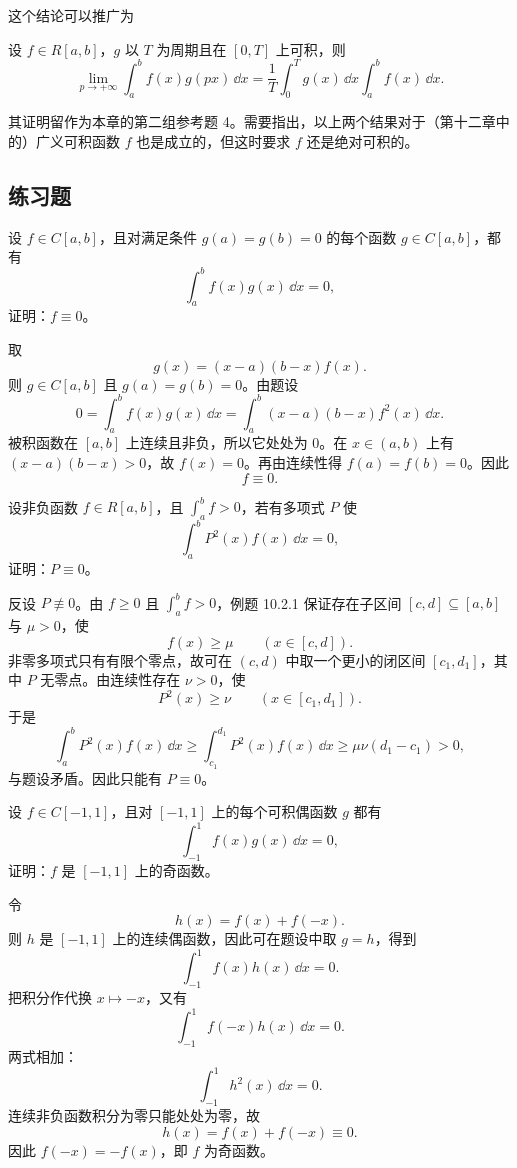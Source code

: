 这个结论可以推广为

\begin{xexample}[10.2.7（Riemann 定理）]
设 $f\in R[a,b]$，$g$ 以 $T$ 为周期且在 $[0,T]$ 上可积，则
\[
  \lim_{p\to+\infty}\int_a^b f(x)g(px)\,\dd x
  =\frac1T\int_0^T g(x)\,\dd x\int_a^b f(x)\,\dd x.
\]
\end{xexample}

其证明留作为本章的第二组参考题 4。需要指出，以上两个结果对于（第十二章中的）广义可积函数 $f$ 也是成立的，但这时要求 $f$ 还是绝对可积的。

\subsection{练习题}

\begin{xexercise}[1]
设 $f\in C[a,b]$，且对满足条件 $g(a)=g(b)=0$ 的每个函数 $g\in C[a,b]$，都有
\[
  \int_a^b f(x)g(x)\,\dd x=0,
\]
证明：$f\equiv0$。
\end{xexercise}
\begin{xsolution}
取
\[
  g(x)=(x-a)(b-x)f(x).
\]
则 $g\in C[a,b]$ 且 $g(a)=g(b)=0$。由题设
\[
  0=\int_a^b f(x)g(x)\,\dd x
  =\int_a^b(x-a)(b-x)f^2(x)\,\dd x.
\]
被积函数在 $[a,b]$ 上连续且非负，所以它处处为 $0$。在 $x\in(a,b)$ 上有 $(x-a)(b-x)>0$，故 $f(x)=0$。再由连续性得 $f(a)=f(b)=0$。因此
\[
  f\equiv0.
\]
\end{xsolution}


\begin{xexercise}[2]
设非负函数 $f\in R[a,b]$，且 $\int_a^b f>0$，若有多项式 $P$ 使
\[
  \int_a^b P^2(x)f(x)\,\dd x=0,
\]
证明：$P\equiv0$。
\end{xexercise}
\begin{xsolution}
反设 $P\not\equiv0$。由 $f\geqslant0$ 且 $\int_a^b f>0$，例题 10.2.1 保证存在子区间 $[c,d]\subseteq[a,b]$ 与 $\mu>0$，使
\[
  f(x)\geqslant\mu\qquad(x\in[c,d]).
\]
非零多项式只有有限个零点，故可在 $(c,d)$ 中取一个更小的闭区间 $[c_1,d_1]$，其中 $P$ 无零点。由连续性存在 $\nu>0$，使
\[
  P^2(x)\geqslant\nu\qquad(x\in[c_1,d_1]).
\]
于是
\[
  \int_a^bP^2(x)f(x)\,\dd x
  \geqslant\int_{c_1}^{d_1}P^2(x)f(x)\,\dd x
  \geqslant\mu\nu(d_1-c_1)>0,
\]
与题设矛盾。因此只能有 $P\equiv0$。
\end{xsolution}


\begin{xexercise}[3]
设 $f\in C[-1,1]$，且对 $[-1,1]$ 上的每个可积偶函数 $g$ 都有
\[
  \int_{-1}^1 f(x)g(x)\,\dd x=0,
\]
证明：$f$ 是 $[-1,1]$ 上的奇函数。
\end{xexercise}
\begin{xsolution}
令
\[
  h(x)=f(x)+f(-x).
\]
则 $h$ 是 $[-1,1]$ 上的连续偶函数，因此可在题设中取 $g=h$，得到
\[
  \int_{-1}^1 f(x)h(x)\,\dd x=0.
\]
把积分作代换 $x\mapsto-x$，又有
\[
  \int_{-1}^1 f(-x)h(x)\,\dd x=0.
\]
两式相加：
\[
  \int_{-1}^1 h^2(x)\,\dd x=0.
\]
连续非负函数积分为零只能处处为零，故
\[
  h(x)=f(x)+f(-x)\equiv0.
\]
因此 $f(-x)=-f(x)$，即 $f$ 为奇函数。
\end{xsolution}


